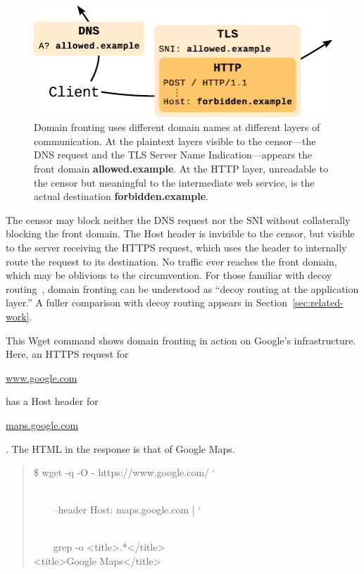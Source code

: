 \documentclass[conference]{IEEEtran}
\def\urll#1{\begin{NoHyper}\url{#1}\end{NoHyper}}
\begin{document}
\begin{figure}[ht]
\centering
\includegraphics[width=\linewidth]{fronting}
\caption{
Domain fronting uses different domain names at different layers of communication.
At the plaintext layers visible to the censor---the DNS request and the
TLS Server Name Indication---appears
the front domain \mbox{\textbf{allowed.example}}.
At the HTTP layer, unreadable to the censor but meaningful to the intermediate web service,
is the actual destination \mbox{\textbf{forbidden.example}}.
}
\label{fig:fronting}
\end{figure}

The censor may block neither the DNS request nor the SNI without
collaterally blocking the front domain.
The Host header is invisible to the censor,
but visible to the server receiving the HTTPS request,
which uses the header to internally route the request to its destination.
No traffic ever reaches the front domain,
which may be oblivious to the circumvention.
For those familiar with decoy routing~\cite{decoyrouting,telex,cirripede,tapdance},
domain fronting can be understood as
``decoy routing at the application layer.''
A fuller comparison with decoy routing appears in Section~\ref{sec:related-work}.

This Wget command shows domain fronting in action
on Google's infrastructure.
Here, an HTTPS request for \urll{www.google.com} has a Host header for
\urll{maps.google.com}. The HTML in the response is that of Google Maps.

\noindent
\begin{quote}
%
\$ wget -q -O - https://www.google.com/ \char`\\\\
\strut~~~~--header \textquotesingle{}Host: maps.google.com\textquotesingle{} | \char`\\\\
\strut~~~~grep -o \textquotesingle{}<title>.*</title>\textquotesingle{}\\
<title>Google Maps</title>
\end{quote}
\end{document}
